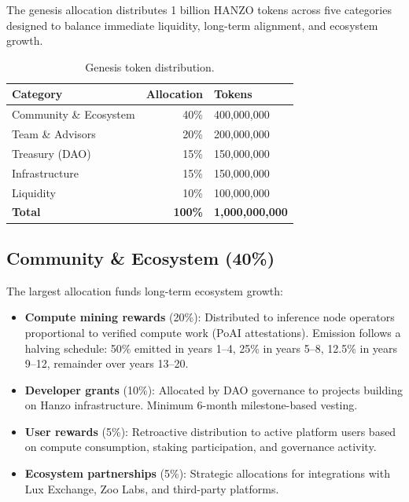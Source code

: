 \documentclass[11pt]{article}
\begin{document}
The genesis allocation distributes 1 billion HANZO tokens across five categories
designed to balance immediate liquidity, long-term alignment, and ecosystem
growth.

\begin{table}[H]
\centering
\begin{tabular}{lrl}
\toprule
\textbf{Category} & \textbf{Allocation} & \textbf{Tokens} \\
\midrule
Community \& Ecosystem & 40\% & 400,000,000 \\
Team \& Advisors & 20\% & 200,000,000 \\
Treasury (DAO) & 15\% & 150,000,000 \\
Infrastructure & 15\% & 150,000,000 \\
Liquidity & 10\% & 100,000,000 \\
\midrule
\textbf{Total} & \textbf{100\%} & \textbf{1,000,000,000} \\
\bottomrule
\end{tabular}
\caption{Genesis token distribution.}
\label{tab:distribution}
\end{table}

\subsection{Community \& Ecosystem (40\%)}

The largest allocation funds long-term ecosystem growth:

\begin{itemize}[leftmargin=1.1em]
    \item \textbf{Compute mining rewards} (20\%): Distributed to inference node
    operators proportional to verified compute work (PoAI attestations). Emission
    follows a halving schedule: 50\% emitted in years 1--4, 25\% in years 5--8,
    12.5\% in years 9--12, remainder over years 13--20.
    \item \textbf{Developer grants} (10\%): Allocated by DAO governance to
    projects building on Hanzo infrastructure. Minimum 6-month milestone-based
    vesting.
    \item \textbf{User rewards} (5\%): Retroactive distribution to active
    platform users based on compute consumption, staking participation, and
    governance activity.
    \item \textbf{Ecosystem partnerships} (5\%): Strategic allocations for
    integrations with Lux Exchange, Zoo Labs, and third-party platforms.
\end{itemize}
\end{document}
